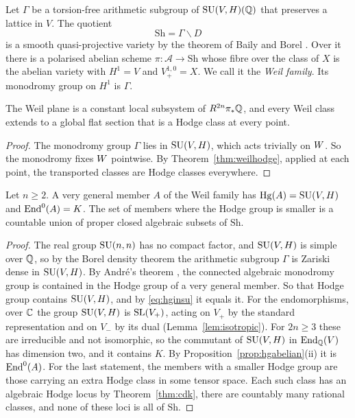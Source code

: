 Let $\Gamma$ be a torsion-free arithmetic subgroup of $\operatorname{SU}(V,H)(\mathbb{Q})$
that preserves a lattice in $V$. The quotient
\[
  \mathrm{Sh}=\Gamma\backslash D
\]
is a smooth quasi-projective variety by the theorem of Baily and Borel
\cite{BB66}. Over it there is a polarised abelian scheme
$\pi\colon\mathcal A\to\mathrm{Sh}$ whose fibre over the class of $X$ is the
abelian variety with $H^{1}=V$ and $V_{+}^{1,0}=X$. We call it the
\emph{Weil family}. Its monodromy group on $H^{1}$ is $\Gamma$.

\begin{proposition}\label{prop:flat}
The Weil plane is a constant local subsystem of $R^{2n}\pi_{*}\mathbb{Q}$, and
every Weil class extends to a global flat section that is a Hodge class at
every point.
\end{proposition}

\begin{proof}
The monodromy group $\Gamma$ lies in $\operatorname{SU}(V,H)$, which acts trivially on
$W$. So the monodromy fixes $W$ pointwise. By
Theorem~\ref{thm:weilhodge}, applied at each point, the transported
classes are Hodge classes everywhere.
\end{proof}

\begin{proposition}\label{prop:generalsu}
Let $n\ge2$. A very general member $A$ of the Weil family has
$\operatorname{Hg}(A)=\operatorname{SU}(V,H)$ and $\operatorname{End}^{0}(A)=K$. The set of members where the Hodge
group is smaller is a countable union of proper closed algebraic subsets
of $\mathrm{Sh}$.
\end{proposition}

\begin{proof}
The real group $\operatorname{SU}(n,n)$ has no compact factor, and $\operatorname{SU}(V,H)$ is simple
over $\mathbb{Q}$, so by the Borel density theorem the arithmetic subgroup $\Gamma$
is Zariski dense in $\operatorname{SU}(V,H)$. By Andr\'e's theorem \cite{And92}, the
connected algebraic monodromy group is contained in the Hodge group of a
very general member. So that Hodge group contains $\operatorname{SU}(V,H)$, and by
\eqref{eq:hginsu} it equals it. For the endomorphisms, over $\mathbb{C}$ the
group $\operatorname{SU}(V,H)$ is $\operatorname{SL}(V_{+})$, acting on $V_{+}$ by the standard
representation and on $V_{-}$ by its dual
(Lemma~\ref{lem:isotropic}). For $2n\ge3$ these are irreducible and not
isomorphic, so the commutant of $\operatorname{SU}(V,H)$ in $\operatorname{End}_{\mathbb{Q}}(V)$ has
dimension two, and it contains $K$. By
Proposition~\ref{prop:hgabelian}(ii) it is $\operatorname{End}^{0}(A)$. For the last
statement, the members with a smaller Hodge group are those carrying an
extra Hodge class in some tensor space. Each such class has an algebraic
Hodge locus by Theorem~\ref{thm:cdk}, there are countably many rational
classes, and none of these loci is all of $\mathrm{Sh}$.
\end{proof}

